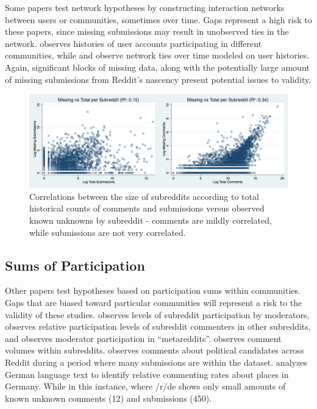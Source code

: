 \documentclass[letterpaper,12pt]{article}
\begin{document}
Some papers test network hypotheses by constructing interaction networks between users or communities, sometimes over time. Gaps represent a high risk to these papers, since missing submissions may result in unobserved ties in the network.  observes histories of user accounts participating in different communities, while  and  observe network ties over time modeled on user histories. Again, significant blocks of missing data, along with the potentially large amount of missing submissions from Reddit's nascency present potential issues to validity.

\begin{figure}[h]
  \centering
  \includegraphics[width=\textwidth]{missing_count_total_count_correlation}
  \caption{Correlations between the size of subreddits according to total historical counts of comments and submissions versus observed known unknowns by subreddit - comments are mildly correlated, while submissions are not very correlated.}
  \label{fig:missing_count_total_count_correlation}
\end{figure}

\subsection{Sums of Participation}

Other papers test hypotheses based on participation sums within communities. Gaps that are biased toward particular communities will represent a risk to the validity of these studies.  observes levels of subreddit participation by moderators, observes relative participation levels of subreddit commenters in other subreddits, and observes moderator participation in ``metareddits''.  observes comment volumes within subreddits.  observes comments about political candidates across Reddit during a period where many submissions are within the dataset.  analyzes German language text to identify relative commenting rates about places in Germany. While in this instance, where /r/de shows only small amounts of known unknown comments (12) and submissions (450). 
\end{document}
